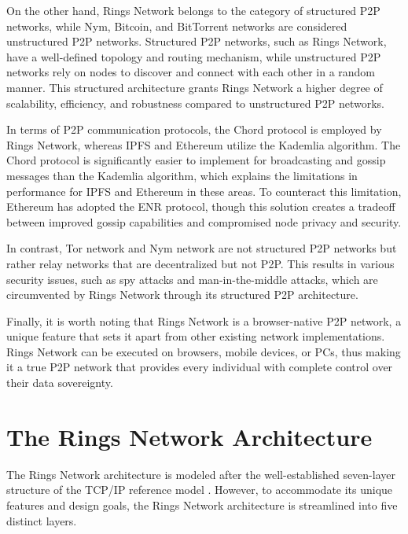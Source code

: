 \documentclass[twocolumn]{article}
\begin{document}
On the other hand, Rings Network belongs to the category of structured P2P networks, while Nym, Bitcoin, and BitTorrent networks are considered unstructured P2P networks. Structured P2P networks, such as Rings Network, have a well-defined topology and routing mechanism, while unstructured P2P networks rely on nodes to discover and connect with each other in a random manner. This structured architecture grants Rings Network a higher degree of scalability, efficiency, and robustness compared to unstructured P2P networks.

In terms of P2P communication protocols, the Chord protocol is employed by Rings Network, whereas IPFS and Ethereum utilize the Kademlia algorithm. The Chord protocol is significantly easier to implement for broadcasting and gossip messages than the Kademlia algorithm, which explains the limitations in performance for IPFS and Ethereum in these areas. To counteract this limitation, Ethereum has adopted the ENR\cite{ENR} protocol, though this solution creates a tradeoff between improved gossip capabilities and compromised node privacy and security.

In contrast, Tor network and Nym network are not structured P2P networks but rather relay networks that are decentralized but not P2P. This results in various security issues, such as spy attacks and man-in-the-middle attacks, which are circumvented by Rings Network through its structured P2P architecture.

Finally, it is worth noting that Rings Network is a browser-native P2P network, a unique feature that sets it apart from other existing network implementations. Rings Network can be executed on browsers, mobile devices, or PCs, thus making it a true P2P network that provides every individual with complete control over their data sovereignty.
\section{The Rings Network Architecture}
The Rings Network architecture is modeled after the well-established seven-layer structure of the TCP/IP reference model \cite{TCP_IP}. However, to accommodate its unique features and design goals, the Rings Network architecture is streamlined into five distinct layers.
\end{document}
